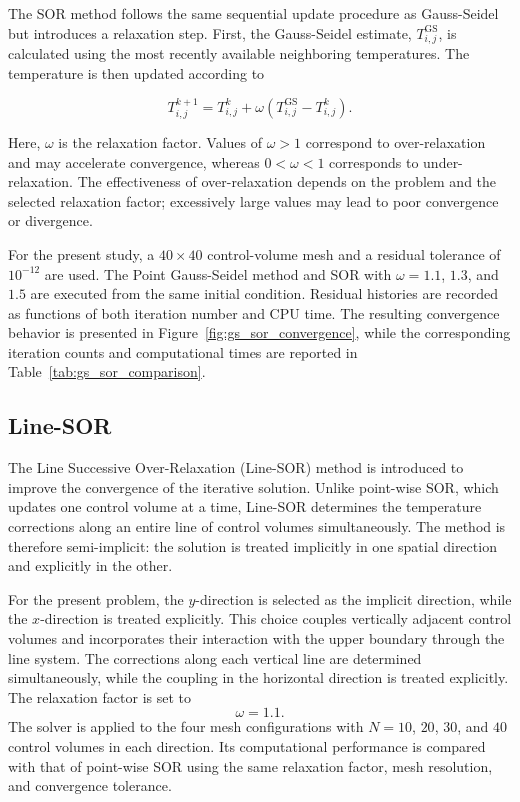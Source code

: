 The SOR method follows the same sequential update procedure as Gauss-Seidel but introduces a relaxation step. First, the Gauss-Seidel estimate, $T_{i,j}^{\mathrm{GS}}$, is calculated using the most recently available neighboring temperatures. The temperature is then updated according to

\begin{equation}
T_{i,j}^{k+1}
=
T_{i,j}^{k}
+
\omega
\left(
T_{i,j}^{\mathrm{GS}}
-
T_{i,j}^{k}
\right).
\label{eq:sor}
\end{equation}

Here, $\omega$ is the relaxation factor. Values of $\omega>1$ correspond to over-relaxation and may accelerate convergence, whereas $0<\omega<1$ corresponds to under-relaxation. The effectiveness of over-relaxation depends on the problem and the selected relaxation factor; excessively large values may lead to poor convergence or divergence.

For the present study, a $40\times40$ control-volume mesh and a residual tolerance of $10^{-12}$ are used. The Point Gauss-Seidel method and SOR with $\omega=1.1$, $1.3$, and $1.5$ are executed from the same initial condition. Residual histories are recorded as functions of both iteration number and CPU time. The resulting convergence behavior is presented in Figure~\ref{fig:gs_sor_convergence}, while the corresponding iteration counts and computational times are reported in Table~\ref{tab:gs_sor_comparison}.


\subsection{Line-SOR}

The Line Successive Over-Relaxation (Line-SOR) method is introduced to improve the convergence of the iterative solution. Unlike point-wise SOR, which updates one control volume at a time, Line-SOR determines the temperature corrections along an entire line of control volumes simultaneously. The method is therefore semi-implicit: the solution is treated implicitly in one spatial direction and explicitly in the other.

For the present problem, the $y$-direction is selected as the implicit direction, while the $x$-direction is treated explicitly. This choice couples vertically adjacent control volumes and incorporates their interaction with the upper boundary through the line system. The corrections along each vertical line are determined simultaneously, while the coupling in the horizontal direction is treated explicitly. The relaxation factor is set to
\[
\omega = 1.1.
\]
The solver is applied to the four mesh configurations with $N=10$, $20$, $30$, and $40$ control volumes in each direction. Its computational performance is compared with that of point-wise SOR using the same relaxation factor, mesh resolution, and convergence tolerance.

